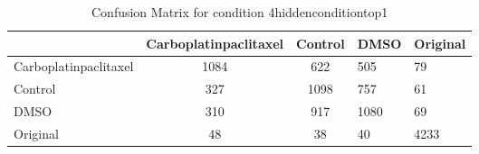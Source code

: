 \begin{table}[htbp]
\centering
\caption{Confusion Matrix for condition 4hiddenconditiontop1}
\label{tab:confusionmatrix.condition.4hiddenconditiontop1}
\begin{tabular}{|l|cc|}
\toprule
 & Carboplatinpaclitaxel & Control & DMSO & Original \\
\midrule
Carboplatinpaclitaxel & 1084 & 622 & 505 & 79 \\
Control & 327 & 1098 & 757 & 61 \\
DMSO & 310 & 917 & 1080 & 69 \\
Original & 48 & 38 & 40 & 4233 \\
\bottomrule
\end{tabular}
\end{table}
